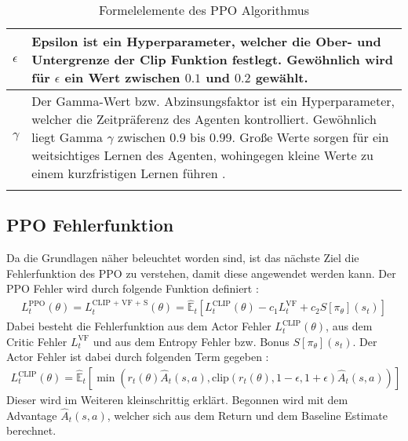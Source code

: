 \begin{longtable}[H]{|p{1.5cm}|p{\linewidth - 2.5cm}|}
	\hline
	$\epsilon$ & Epsilon ist ein Hyperparameter, welcher die Ober- und Untergrenze der Clip Funktion festlegt. Gewöhnlich wird für $\epsilon$ ein Wert zwischen $0.1$ und $0.2$ gewählt. \\
	\hline
	$\gamma$ & Der Gamma-Wert bzw. Abzinsungsfaktor ist ein Hyperparameter, welcher die Zeitpräferenz des Agenten kontrolliert. Gewöhnlich liegt Gamma $\gamma$ zwischen 0.9 bis 0.99. Große Werte sorgen für ein weitsichtiges Lernen des Agenten, wohingegen kleine Werte zu einem kurzfristigen Lernen führen \citep[S. 43 bzw. Summary of Notation S. xv]{Sutton1998}. \\
	\hline
	\caption{Formelelemente des PPO Algorithmus}
	\label{tab:Grundlagen_Formelelemente_PPO} 
\end{longtable}

\subsection{PPO Fehlerfunktion} \label{subsec:Grundlagen_PPO_Fehlerfunktion}
Da die Grundlagen näher beleuchtet worden sind, ist das nächste Ziel die Fehlerfunktion des PPO zu verstehen, damit diese angewendet werden kann. Der PPO Fehler wird durch folgende Funktion definiert \citep[S. 5]{PPO}:
\begin{align}
	\label{eq:PPO_Training_Loss}
	L^\text{PPO}_{t} (\theta) = L^\text{CLIP + VF + S}_{t} (\theta) = \mathbb{\hat{E}}_{t} [L^{\text{CLIP}}_{t}(\theta) - c_{1}L^{\text{VF}}_{t} + c_{2}S[\pi_{\theta}](s_{t})]
\end{align}
Dabei besteht die Fehlerfunktion aus dem Actor Fehler $L^{\text{CLIP}}_{t}(\theta)$, aus dem Critic Fehler $L^{\text{VF}}_{t}$ und aus dem Entropy Fehler bzw. Bonus $S[\pi_{\theta}](s_{t})$. Der Actor Fehler ist dabei durch folgenden Term gegeben \citep[S. 3]{PPO}:
\begin{align}
	\label{eq:Grundlagen_Actor_Loss}
	L^\text{CLIP}_{t} (\theta) = \mathbb{\hat{E}}_{t} [ \min(r_{t}(\theta) \hat{A}_{t}(s, a), \text{clip}(r_{t}(\theta), 1 - \epsilon, 1 + \epsilon) \hat{A}_{t}(s, a))]
\end{align}
Dieser wird im Weiteren kleinschrittig erklärt. Begonnen wird mit dem Advantage $\hat{A}_{t}(s, a)$, welcher sich aus dem Return und dem Baseline Estimate berechnet.

